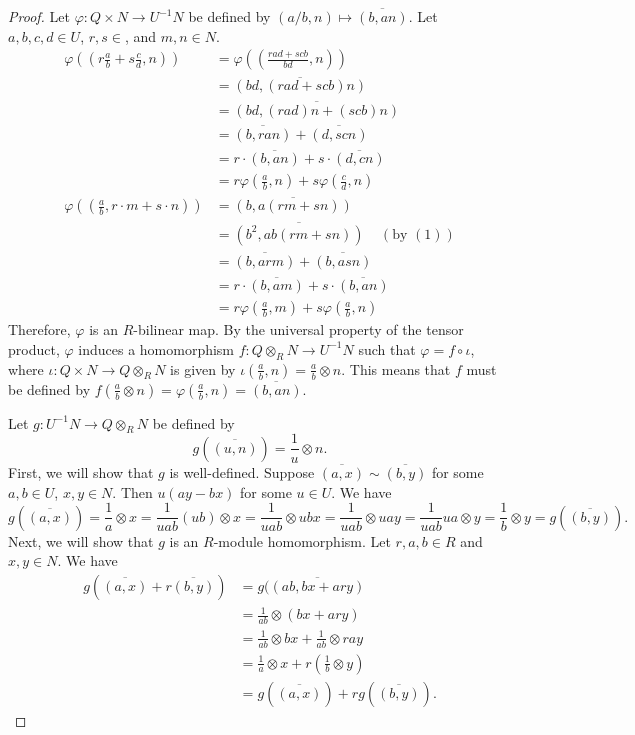 \documentclass[10pt]{article}
\renewcommand{\bar}{\overline}
\begin{document}
\begin{enumerate}
\begin{proof}
Let $\varphi: Q \times N \rightarrow U^{-1}N$ be defined by $(a/b,n) \mapsto \overline{(b,an)}$.  Let $a,b,c,d \in U$, $r,s \in $, and $m,n \in N$.
\begin{align*}
\varphi\left(\left(r\frac{a}{b} + s\frac{c}{d},n\right)\right) &= \varphi\left(\left(\frac{rad + scb}{bd},n\right)\right)
\\
&= \bar{\left(bd,\left(rad + scb\right)n\right)}
\\
&= \bar{\left(bd, \left(rad\right)n + \left(scb\right)n\right)}
\\
&= \bar{\left(b,ran\right)} + \bar{\left(d,scn\right)}
\\
&=r\cdot \bar{\left(b,an\right)} + s\cdot \bar{\left(d,cn\right)}
\\
&= r \varphi\left(\frac{a}{b},n\right) + s \varphi\left(\frac{c}{d},n\right)
\\
\varphi\left(\left(\frac{a}{b},r\cdot m + s \cdot n\right)\right)
&= \bar{\left(b,a\left(rm + sn\right)\right)}
\\
&= \bar{\left(b^2,ab\left(rm + sn\right)\right)} \ \ \ \ \ \left(\text{by } (1) \right)
\\
&= \bar{\left(b,arm\right)} + \bar{\left(b,asn\right)}
\\
&= r \cdot \bar{\left(b,am\right)} + s \cdot \bar{\left(b,an\right)}
\\
&= r \varphi\left(\frac{a}{b}, m\right) + s \varphi\left(\frac{a}{b},n\right)
\end{align*}
Therefore, $\varphi$ is an $R$-bilinear map.  By the universal property of the tensor product, $\varphi$ induces a homomorphism $f : Q \otimes_R N \rightarrow U^{-1}N$ such that $\varphi = f \circ \iota$, where $\iota: Q \times N \rightarrow Q \otimes_R N$ is given by $\iota(\frac{a}{b}, n) = \frac{a}{b} \otimes n$.  This means that $f$ must be defined by $f(\frac{a}{b} \otimes n) = \varphi(\frac{a}{b},n) = \bar{(b,an)}$.

Let $g: U^{-1}N \rightarrow Q \otimes_R N$ be defined by
$$
g(\overline{(u,n)}) = \frac1u \otimes n.
$$
First, we will show that $g$ is well-defined.  Suppose $\bar{(a,x)} \sim \bar{(b,y)}$ for some $a,b \in U$, $x,y \in N$.  Then $u(ay - bx)$ for some $u \in U$.  We have
$$
g(\overline{(a,x)}) = \frac{1}{a} \otimes x = \frac{1}{uab}(ub) \otimes x = \frac{1}{uab} \otimes ubx = \frac{1}{uab} \otimes uay = \frac{1}{uab}ua \otimes y = \frac{1}{b} \otimes y = g(\overline{(b,y)}).
$$
Next, we will show that $g$ is an $R$-module homomorphism.  Let $r,a,b \in R$ and $x,y \in N$.  We have
\begin{align*}
g(\bar{(a,x)} + r \bar{(b,y)}) &= g(\bar{(ab,bx+ary)}
\\
&= \frac{1}{ab} \otimes (bx+ary)
\\
&= \frac{1}{ab} \otimes bx + \frac{1}{ab} \otimes ray
\\
&= \frac1a \otimes x + r(\frac{1}{b} \otimes y)
\\
&= g(\bar{(a,x)}) + r g(\bar{(b,y)}).
\end{align*}


\end{proof}
\end{enumerate}
\end{document}
